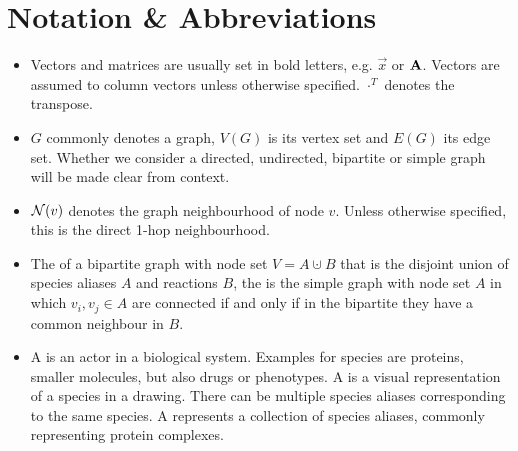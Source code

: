 \documentclass[
	fontsize=10pt, %
	twoside=false, %
	secnumdepth=1, %
]{kaobook}
\begin{document}
\section{Notation \& Abbreviations  }
\begin{itemize}
\item Vectors and matrices are usually set in bold letters, e.g. $\vec x$ or
  $\mathbf{A}$. Vectors are assumed to column vectors unless otherwise specified.
  $\cdot^T$ denotes the transpose.
\item $G$ commonly denotes a graph, $V(G)$ is its vertex set and $E(G)$ its edge
  set. Whether we consider a directed, undirected, bipartite or simple graph
  will be made clear from context.
\item $\mathcal{N}(v)$ denotes the graph neighbourhood of node $v$. Unless otherwise
  specified, this is the direct 1-hop neighbourhood.
\item The  of a bipartite graph with node set $V = A
  \cupdot B$ that is the disjoint union of species aliases $A$ and reactions
  $B$, the  is the simple graph with node set
  $A$ in which $v_i, v_j \in A$ are connected if and only if in the bipartite
  they have a common neighbour in $B$.
\item A  is an actor in a biological system. Examples for species
  are proteins, smaller molecules, but also drugs or phenotypes. A  is a visual representation of a species in a drawing. There can be
  multiple species aliases corresponding to the same species. A  represents a collection of species aliases, commonly
  representing protein complexes.
\end{itemize}





\backmatter %

\end{document}
